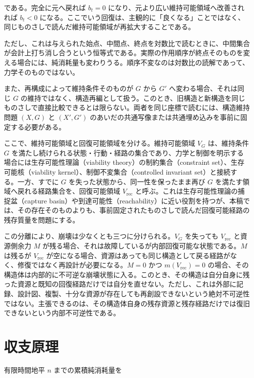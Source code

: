 \documentclass[12pt,a4paper]{article}
\begin{document}
である。完全に元へ戻れば \(b_{t}=0\) になり、元より広い維持可能領域へ改善されれば \(b_{t}<0\) になる。ここでいう回復は、主観的に「良くなる」ことではなく、同じものさしで読んだ維持可能領域が再拡大することである。

ただし、これは与えられた始点、中間点、終点を対数比で読むときに、中間集合が会計上打ち消し合うという恒等式である。実際の作用順序が終点そのものを変える場合には、純消耗量も変わりうる。順序不変なのは対数比の読解であって、力学そのものではない。

また、再構成によって維持条件そのものが \(G\) から \(G'\) へ変わる場合、それは同じ \(G\) の維持ではなく、構造再編として扱う。このとき、旧構造と新構造を同じものさしで直接比較できるとは限らない。両者を同じ座標で読むには、構造維持問題 \((X,G)\) と \((X',G')\) のあいだの共通写像または共通埋め込みを事前に固定する必要がある。

ここで、維持可能領域と回復可能領域を分ける。維持可能領域 \(V_{G}\) は、維持条件 \(G\) を満たし続けられる状態・行動・経路の集合であり、力学と制御を明示する場合には生存可能性理論（viability theory）の制約集合（constraint set）、生存可能核（viability kernel）、制御不変集合（controlled invariant set）と接続する。一方、すでに \(G\) を失った状態から、同一性を保ったまま再び \(G\) を満たす領域へ戻れる経路集合を、回復可能領域 \(V_{\mathrm{rec}}\) と呼ぶ。これは生存可能性理論の捕捉盆（capture basin）や到達可能性（reachability）に近い役割を持つが、本稿では、その存在そのものよりも、事前固定されたものさしで読んだ回復可能経路の残存質量を問題にする。

この分離により、崩壊は少なくとも三つに分けられる。\(V_{G}\) を失っても \(V_{\mathrm{rec}}\) と資源側余力 \(M\) が残る場合、それは故障しているが内部回復可能な状態である。\(M\) は残るが \(V_{\mathrm{rec}}\) が空になる場合、資源はあっても同じ構造として戻る経路がなく、修復ではなく再設計が必要になる。\(M=0\) かつ \(m(V_{\mathrm{rec}})=0\) の場合、その構造体は内部的に不可逆な崩壊状態に入る。このとき、その構造は自分自身に残った資源と既知の回復経路だけでは自分を直せない。ただし、これは外部に記録、設計図、複製、十分な資源が存在しても再創設できないという絶対不可逆性ではない。主張できるのは、その構造体自身の残存資源と残存経路だけでは復旧できないという内部不可逆性である。

\section{収支原理}\label{ux53ceux652fux539fux7406}

有限時間地平 \(n\) までの累積純消耗量を
\end{document}
